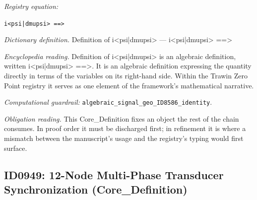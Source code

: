 \documentclass[11pt]{article}
\theoremstyle{remark}
\begin{document}
\noindent\textit{Registry equation:}\par
{\small\texttt{i<psi|dmupsi> ==>}}\par\medskip
\noindent\textit{Dictionary definition.} Definition of i<psi|dmupsi> --- i<psi|dmupsi> ==>\par\medskip
\noindent\textit{Encyclopedia reading.} Definition of i<psi|dmupsi> is an algebraic definition, written i<psi|dmupsi> ==>. It is an algebraic definition expressing the quantity directly in terms of the variables on its right-hand side. Within the Trawin Zero Point registry it serves as one element of the framework's mathematical narrative.
\par\medskip\noindent\textit{Computational guardrail:} \texttt{algebraic\_signal\_geo\_ID8586\_identity}.
\par\medskip\noindent\textit{Obligation reading.} This Core\_Definition fixes an object the rest of the chain consumes. In proof order it must be discharged first; in refinement it is where a mismatch between the manuscript's usage and the registry's typing would first surface.

\subsection{ID0949: 12-Node Multi-Phase Transducer Synchronization (Core\_Definition)}
\end{document}
